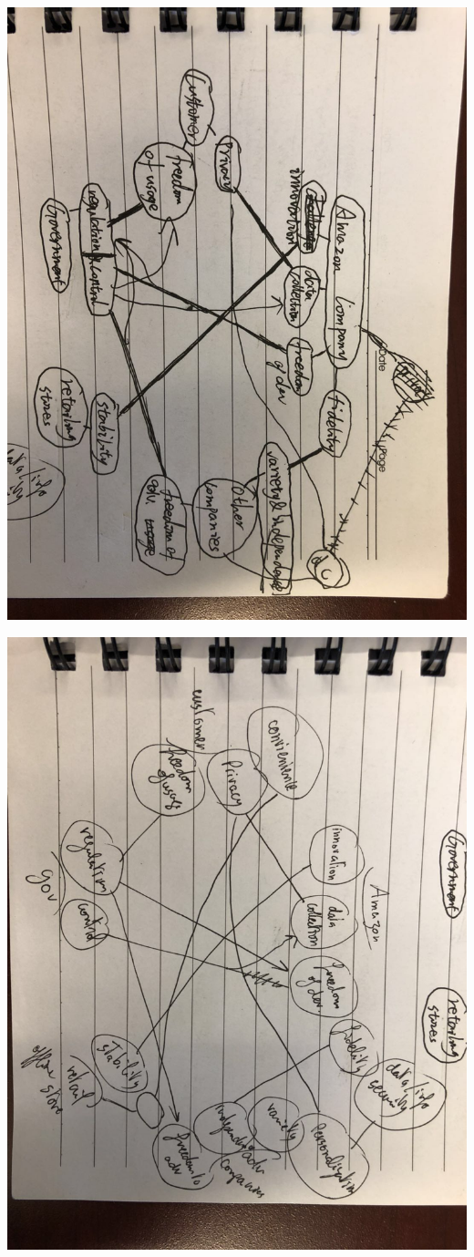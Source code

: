 \documentclass{article}
\begin{document}
\includegraphics[scale=0.25,angle=90]{iter_2.jpeg}

\includegraphics[scale=0.25,angle=90]{iter_3.jpeg}
\end{document}
